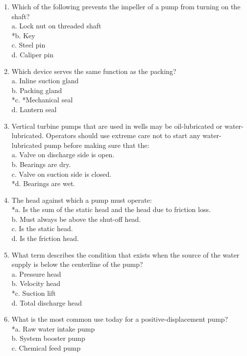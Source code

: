 \begin{enumerate}[1.]
\item Which of the following prevents the impeller of a pump from turning on the shaft?\\
a. Lock nut on threaded shaft\\
*b. Key\\
c. Steel pin\\
d. Caliper pin\\
\item Which device serves the same function as the packing?\\
a. Inline suction gland\\
b. Packing gland\\
*c. *Mechanical seal\\
d. Lantern seal\\
\item Vertical turbine pumps that are used in wells may be oil-lubricated or water-lubricated. Operators should use extreme care not to start any water-lubricated pump before making sure that the:\\
a. Valve on discharge side is open.\\
b. Bearings are dry.\\
c. Valve on suction side is closed.\\
*d. Bearings are wet.\\
\item The head against which a pump must operate:\\
*a. Is the sum of the static head and the head due to friction loss.\\
b. Must always be above the shut-off head.\\
c. Is the static head.\\
d. Is the friction head.\\
\item What term describes the condition that exists when the source of the water supply is below the centerline of the pump?\\
a. Pressure head\\
b. Velocity head\\
*c. Suction lift\\
d. Total discharge head\\
\item What is the most common use today for a positive-displacement pump?\\
*a. Raw water intake pump\\
b. System booster pump\\
c. Chemical feed pump\\

\end{enumerate}
